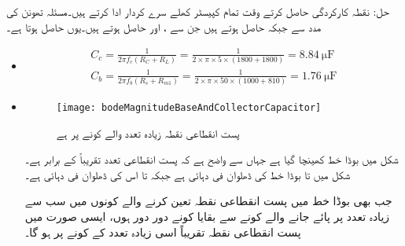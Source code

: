 حل:
نقطہ کارکردگی حاصل کرتے وقت تمام کپیسٹر کھلے سرے کردار ادا کرتے ہیں۔مسئلہ تھونن کی مدد سے  جبکہ  حاصل ہوتے ہیں جن سے ،  اور  حاصل ہوتے ہیں۔یوں  حاصل ہوتا ہے۔
\begin{itemize}
\item
\begin{align*}
C_c=\frac{1}{2 \pi f_c \left(R_C+R_L \right) }=\frac{1}{2 \times \pi \times 5 \times \left(1800+1800 \right)}=\SI{8.84}{\micro \farad}\\
C_b=\frac{1}{2 \pi f_b \left(R_s+R_{m1} \right) }=\frac{1}{2 \times \pi \times 50 \times \left(1000+810 \right)}=\SI{1.76}{\micro \farad}
\end{align*}
%
\item
%
\begin{figure}
\centering
\texttt{[image: bodeMagnitudeBaseAndCollectorCapacitor]}
\caption{پست انقطاعی نقطہ زیادہ تعدد والے کونے پر ہے}
\label{شکل_تعددی_ردعمل_قابو_کپیسٹر_پست_انقطاعی_تعین}
\end{figure}
شکل  میں بوڈا خط کھینچا گیا ہے جہاں سے واضح ہے کہ پست انقطاعی تعدد تقریباً  کے برابر ہے۔شکل میں  تا  بوڈا خط کی ڈھلوان  فی دہائی ہے جبکہ  تا  اس کی ڈھلوان  فی دہائی ہے۔

جب بھی بوڈا خط میں پست انقطاعی نقطہ تعین کرنے والے کونوں میں سب سے زیادہ تعدد پر پائے جانے والے کونے سے بقایا کونے دور دور ہوں، ایسی صورت میں پست انقطاعی نقطہ تقریباً اسی زیادہ تعدد کے کونے پر ہو گا۔


\end{itemize}
